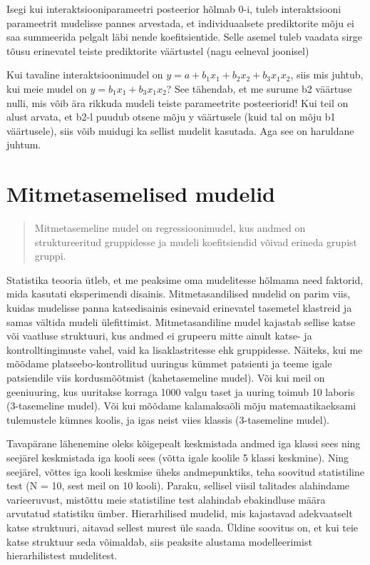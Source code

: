 \documentclass[]{book}
\begin{document}
Isegi kui interaktsiooniparameetri posteerior hõlmab 0-i, tuleb interaktsiooni parameetrit mudelisse pannes arvestada, et individuaalsete prediktorite mõju ei saa summeerida pelgalt läbi nende koefitsientide.
Selle asemel tuleb vaadata sirge tõusu erinevatel teiste prediktorite väärtustel (nagu eelneval joonisel)

Kui tavaline interaktsioonimudel on \(y = a + b_1x_1 + b_2x_2 + b_3x_1x_2\), siis mis juhtub, kui meie mudel on \(y = b_1x_1 + b_3x_1x_2\)? See tähendab, et me surume b2 väärtuse nulli, mis võib ära rikkuda mudeli teiste parameetrite posteeriorid! Kui teil on alust arvata, et b2-l puudub otsene mõju y väärtusele (kuid tal on mõju b1 väärtusele), siis võib muidugi ka sellist mudelit kasutada.
Aga see on haruldane juhtum.

\hypertarget{mitmetasemelised-mudelid}{%
\chapter{Mitmetasemelised mudelid}\label{mitmetasemelised-mudelid}}

\begin{quote}
Mitmetasemeline mudel on regressioonimudel, kus andmed on struktureeritud gruppidesse ja mudeli koefitsiendid võivad erineda grupist gruppi.
\end{quote}

Statistika teooria ütleb, et me peaksime oma mudelitesse hõlmama need faktorid, mida kasutati eksperimendi disainis. Mitmetasandilised mudelid on parim viis, kuidas mudelisse panna katsedisainis esinevaid erinevatel tasemetel klastreid ja samas vältida mudeli ülefittimist.
Mitmetasandiline mudel kajastab sellise katse või vaatluse struktuuri, kus andmed ei grupeeru mitte ainult katse- ja kontrolltingimuste vahel, vaid ka lisaklastritesse ehk gruppidesse. Näiteks, kui me mõõdame platseebo-kontrollitud uuringus kümmet patsienti ja teeme igale patsiendile viis kordusmõõtmist (kahetasemeline mudel). Või kui meil on geeniuuring, kus uuritakse korraga 1000 valgu taset ja uuring toimub 10 laboris (3-tasemeline mudel). Või kui mõõdame kalamaksaõli mõju matemaatikaeksami tulemustele kümnes koolis, ja igas neist viies klassis (3-tasemeline mudel).

Tavapärane lähenemine oleks kõigepealt keskmistada andmed iga klassi sees ning seejärel keskmistada iga kooli sees (võtta igale koolile 5 klassi keskmine). Ning seejärel, võttes iga kooli keskmise üheks andmepunktiks, teha soovitud statistiline test (N = 10, sest meil on 10 kooli). Paraku, sellisel viisil talitades alahindame varieeruvust, mistõttu meie statistiline test alahindab ebakindluse määra arvutatud statistiku ümber. Hierarhilised mudelid, mis kajastavad adekvaatselt katse struktuuri, aitavad sellest murest üle saada. Üldine soovitus on, et kui teie katse struktuur seda võimaldab, siis peaksite alustama modelleerimist hierarhilistest mudelitest.
\end{document}
